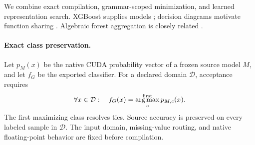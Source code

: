 We combine exact compilation, grammar-scoped minimization, and learned representation search. XGBoost supplies models \citep{chen2016}; decision diagrams motivate function sharing \citep{bryant1986}. Algebraic forest aggregation is closely related \citep{gossen2023}.

\paragraph{Exact class preservation.}
Let $p_M(x)$ be the native CUDA probability vector of a frozen source model $M$, and let $f_G$ be the exported classifier. For a declared domain $\mathcal D$, acceptance requires
\begin{equation}
  \forall x\in\mathcal D:\quad
  f_G(x)=\operatorname*{arg\,max}^{\mathrm{first}}_c p_{M,c}(x).
  \label{eq:class-preservation}
\end{equation}
The first maximizing class resolves ties. Source accuracy is preserved on every labeled sample in $\mathcal D$. The input domain, missing-value routing, and native floating-point behavior are fixed before compilation.



